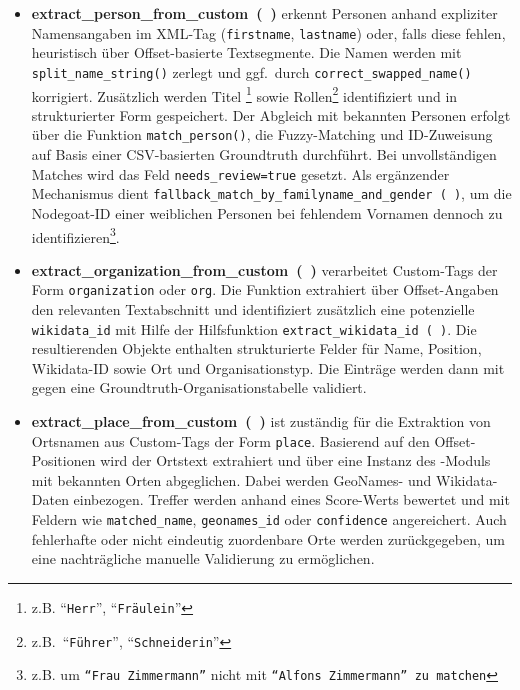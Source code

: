 \documentclass[12pt, a4paper, ngerman, bidi=default]{article}
\newcommand{\code}[1]{\colorbox{VeryLightGray}{\texttt{#1}}} %
\begin{document}
\begin{itemize}
\item \textbf{extract\_person\_from\_custom~(~)} erkennt Personen anhand expliziter Namensangaben im XML-Tag (\code{firstname}, \code{lastname}) oder, falls diese fehlen, heuristisch über Offset-basierte Textsegmente. Die Namen werden mit \code{split\_name\_string()} zerlegt und ggf.\ durch \code{correct\_swapped\_name()} korrigiert. Zusätzlich werden Titel \footnote{z.B. \enquote{\texttt{Herr}}, \enquote{\texttt{Fräulein}}} sowie Rollen\footnote{z.B.\ \enquote{\texttt{Führer}}, \enquote{\texttt{Schneiderin}}} identifiziert und in strukturierter Form gespeichert. Der Abgleich mit bekannten Personen erfolgt über die Funktion \code{match\_person()}, die Fuzzy-Matching und ID-Zuweisung auf Basis einer CSV-basierten Groundtruth durchführt. Bei unvollständigen Matches wird das Feld \code{needs\_review=true} gesetzt. Als ergänzender Mechanismus dient \code{fallback\_match\_by\_familyname\_and\_gender~(~)}, um die Nodegoat-ID einer weiblichen Personen bei fehlendem Vornamen dennoch zu identifizieren\footnote{z.B. um \texttt{\enquote{Frau Zimmermann}} nicht mit \code{\enquote{Alfons Zimmermann} zu matchen}}.

\item \textbf{extract\_organization\_from\_custom~(~)} verarbeitet Custom-Tags der Form \code{organization} oder \code{org}. Die Funktion extrahiert über Offset-Angaben den relevanten Textabschnitt und identifiziert zusätzlich eine potenzielle \code{wikidata\_id} mit Hilfe der Hilfsfunktion \code{extract\_wikidata\_id~(~)}. Die resultierenden Objekte enthalten strukturierte Felder für Name, Position, Wikidata-ID sowie Ort und Organisationstyp. Die Einträge werden dann mit \code{} gegen eine Groundtruth-Organisationstabelle validiert.

\item \textbf{extract\_place\_from\_custom~(~)} ist zuständig für die Extraktion von Ortsnamen aus Custom-Tags der Form \code{place}. Basierend auf den Offset-Positionen wird der Ortstext extrahiert und über eine Instanz des \code{}-Moduls mit bekannten Orten abgeglichen. Dabei werden GeoNames- und Wikidata-Daten einbezogen. Treffer werden anhand eines Score-Werts bewertet und mit Feldern wie \code{matched\_name}, \code{geonames\_id} oder \code{confidence} angereichert. Auch fehlerhafte oder nicht eindeutig zuordenbare Orte werden zurückgegeben, um eine nachträgliche manuelle Validierung zu ermöglichen.


\end{itemize}
\end{document}
